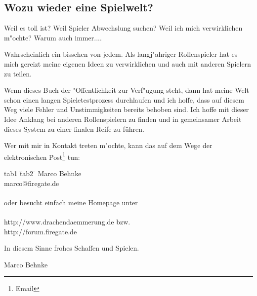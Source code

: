 \subsection*{Wozu wieder eine Spielwelt?}
\par Weil es toll ist? Weil Spieler Abwechslung suchen? Weil ich mich verwirklichen m"ochte? Warum auch immer....
\par Wahrscheinlich ein bisschen von jedem. Als langj"ahriger Rollenspieler hat es mich gereizt meine eigenen Ideen zu verwirklichen und auch mit anderen Spielern zu teilen.
\par Wenn dieses Buch der "Offentlichkeit zur Verf"ugung steht, dann hat meine Welt schon einen langen Spieletestprozess durchlaufen und ich hoffe, dass auf diesem Weg viele Fehler und Unstimmigkeiten bereits behoben sind. Ich hoffe mit dieser Idee Anklang bei anderen Rollenspielern zu finden und in gemeinsamer Arbeit dieses System zu einer finalen Reife zu führen.
\par Wer mit mir in Kontakt treten m"ochte,
kann das auf dem Wege der elektronischen
Post\footnote{Email} tun:
\\
\begin{tabbing}
tab1 \= tab2 \= \kill
\> \> Marco Behnke\\
\> \> marco@firegate.de\\
\\
oder besucht einfach meine Homepage unter
\\
\\
\> \> http://www.drachendaemmerung.de bzw.\\
\> \> http://forum.firegate.de\\
\end{tabbing}
\par In diesem Sinne frohes Schaffen und Spielen.
\par Marco Behnke
